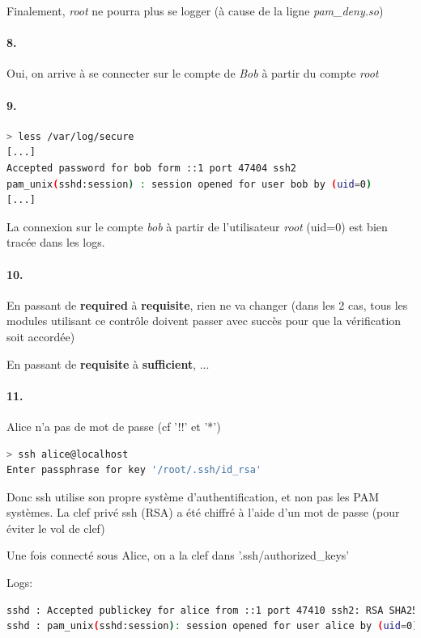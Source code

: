 \documentclass[10pt]{article}
\begin{document}
        Finalement, \textit{root} ne pourra plus se logger (à cause de la ligne \textit{pam\_deny.so})

        
        \paragraph{8.} Oui, on arrive à se connecter sur le compte de \textit{Bob} à partir du compte \textit{root}
        
        \paragraph{9.}

\begin{lstlisting}[language=bash]
> less /var/log/secure
[...]
Accepted password for bob form ::1 port 47404 ssh2
pam_unix(sshd:session) : session opened for user bob by (uid=0)
[...]
\end{lstlisting}

La connexion sur le compte \textit{bob} à partir de l'utilisateur \textit{root} (uid=0) est bien tracée dans les logs.

        \paragraph{10.}
        En passant de \textbf{required} à \textbf{requisite}, rien ne va changer (dans les 2 cas, tous les modules utilisant ce contrôle doivent passer avec succès pour que la vérification soit accordée)
        
        En passant de \textbf{requisite} à \textbf{sufficient}, ...
        
        \paragraph{11.} Alice n'a pas de mot de passe (cf '!!' et '*')
        
\begin{lstlisting}[language=bash]
> ssh alice@localhost
Enter passphrase for key '/root/.ssh/id_rsa'
\end{lstlisting}

Donc ssh utilise son propre système d'authentification, et non pas les PAM systèmes.
La clef privé ssh (RSA) a été chiffré à l'aide d'un mot de passe (pour éviter le vol de clef)

Une fois connecté sous Alice, on a la clef dans '.ssh/authorized\_keys'

Logs:
\begin{lstlisting}[language=bash]
sshd : Accepted publickey for alice from ::1 port 47410 ssh2: RSA SHA256:/JdhKRDYT.....
sshd : pam_unix(sshd:session): session opened for user alice by (uid=0)
\end{lstlisting}
\end{document}
